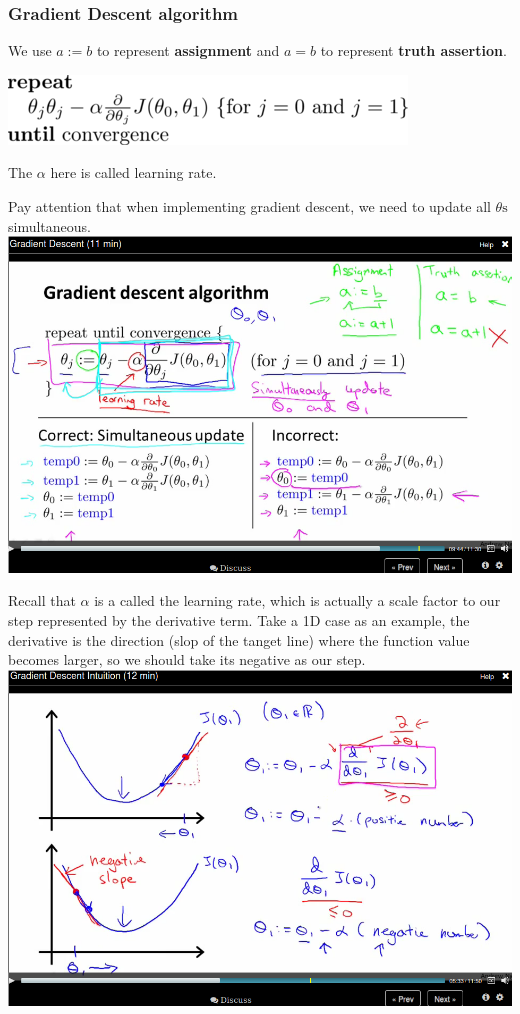\documentclass[11pt]{article}
\begin{document}
\subsubsection*{Gradient Descent algorithm}
\label{sec-3-4-1}

We use $a := b$ to represent \textbf{assignment} and \( a = b\) to represent \textbf{truth assertion}.



\includegraphics[width=.9\linewidth]{test.png}


The $\alpha$ here is called learning rate.

Pay attention that when implementing gradient descent, we need to update all $\theta\text{s}$ simultaneous.
\includegraphics[width=.9\linewidth]{./images/screenshot-10.png}

Recall that $\alpha$ is a called the learning rate, which is actually a scale factor to our step represented by the derivative term. Take a 1D case as an example, the derivative is the direction (slop of the tanget line) where the function value becomes larger, so we should take its negative as our step.
\includegraphics[width=.9\linewidth]{./images/screenshot-11.png}
\end{document}
